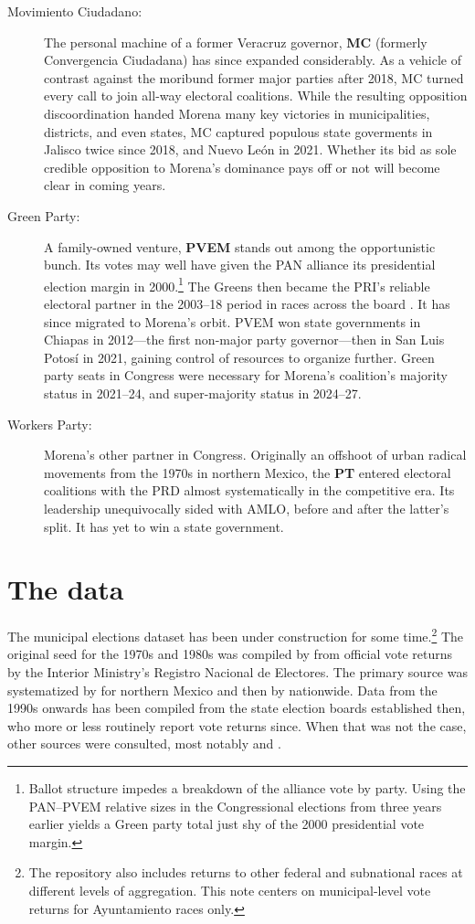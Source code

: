 \documentclass[letter,12pt]{article}
\begin{document}
\begin{description}
\item[Movimiento Ciudadano:] The personal machine of a former Veracruz governor, \textbf{MC} (formerly Convergencia Ciudadana) has since expanded considerably. As a vehicle of contrast against the moribund former major parties after 2018, MC turned every call to join all-way electoral coalitions. While the resulting opposition discoordination handed Morena many key victories in municipalities, districts, and even states, MC captured populous state goverments in Jalisco twice since 2018, and Nuevo León in 2021. Whether its bid as sole credible opposition to Morena's dominance pays off or not will become clear in coming years.

\item[Green Party:] A family-owned venture, \textbf{PVEM} stands out among the opportunistic bunch. Its votes may well have given the PAN alliance its presidential election margin in 2000.\footnote{Ballot structure impedes a breakdown of the alliance vote by party. Using the PAN--PVEM relative sizes in the Congressional elections from three years earlier yields a Green party total just shy of the 2000 presidential vote margin.} The Greens then became the PRI's reliable electoral partner in the 2003--18 period in races across the board \citep{spoon.pulido.PRI-PVEM2017}. It has since migrated to Morena's orbit. PVEM won state governments in Chiapas in 2012---the first non-major party governor---then in San Luis Potosí in 2021, gaining control of resources to organize further. Green party seats in Congress were necessary for Morena's coalition's majority status in 2021--24, and super-majority status in 2024--27.

\item[Workers Party:] Morena's other partner in Congress. Originally an offshoot of urban radical movements from the 1970s in northern Mexico, the \textbf{PT} entered electoral coalitions with the PRD almost systematically in the competitive era. Its leadership unequivocally sided with AMLO, before and after the latter's split. It has yet to win a state government. 
\end{description}

\section{The data}

The municipal elections dataset has been under construction for some time.\footnote{The repository also includes returns to other federal and subnational races at different levels of aggregation. This note centers on municipal-level vote returns for Ayuntamiento races only.} The original seed for the 1970s and 1980s was compiled by \citet{molinar.1991a} from official vote returns by the Interior Ministry's Registro Nacional de Electores. The primary source was systematized by \citet{magar.1994} for northern Mexico and then by \citet{varela.2004} nationwide. Data from the 1990s onwards has been compiled from the state election boards established then, who more or less routinely report vote returns since. When that was not the case, other sources were consulted, most notably \citet{revista.voz.y.voto} and \citet{cede.uam.izt}.
\end{document}
